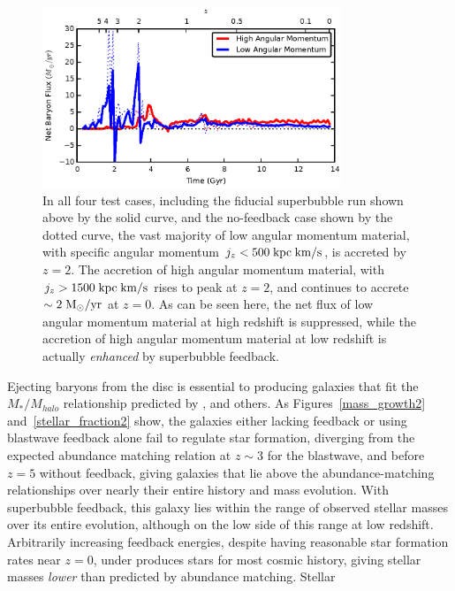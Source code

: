 \begin{figure}
    \includegraphics[width=0.8\textwidth]{figures2/angular_momentum_netflux.eps}
    \caption[Net accretion as a function of angular momentum]{In all four test
    cases, including the fiducial superbubble run shown above by the solid
    curve, and the no-feedback case shown by the dotted curve, the vast majority
    of low angular momentum material, with specific angular momentum $ j_z <
    500\; \rm {kpc\; km/s}$, is accreted by $z=2$.  The accretion of high
    angular momentum material, with $j_z > 1500\; \rm{kpc\; km/s}$ rises to peak
    at $z=2$, and continues to accrete $\sim 2\; \rm{M_\odot/yr}$ at $z=0$.  As
    can be seen here, the net flux of low angular momentum material at high
    redshift is suppressed, while the accretion of high angular momentum
    material at low redshift is actually {\it enhanced} by superbubble
    feedback.}
        \label{angular_momentum_netflux2}
\end{figure}
Ejecting baryons from the disc is essential to producing galaxies that fit the
$M_*/M_{halo}$ relationship predicted by \citet{Behroozi2013},
\citet{Moster2013} and others.  As Figures~\ref{mass_growth2}
and~\ref{stellar_fraction2} show, the galaxies either lacking feedback or using
blastwave feedback alone fail to regulate star formation, diverging from the
expected abundance matching relation at $z\sim3$ for the blastwave, and before
$z=5$ without feedback, giving galaxies that lie above the abundance-matching
relationships over nearly their entire history and mass evolution.  With
superbubble feedback, this galaxy lies within the range of observed stellar
masses over its entire evolution, although on the low side of this range at low
redshift.  Arbitrarily increasing feedback energies, despite having reasonable
star formation rates near $z=0$, under produces stars for most cosmic history,
giving stellar masses {\it lower} than predicted by abundance matching.  Stellar
